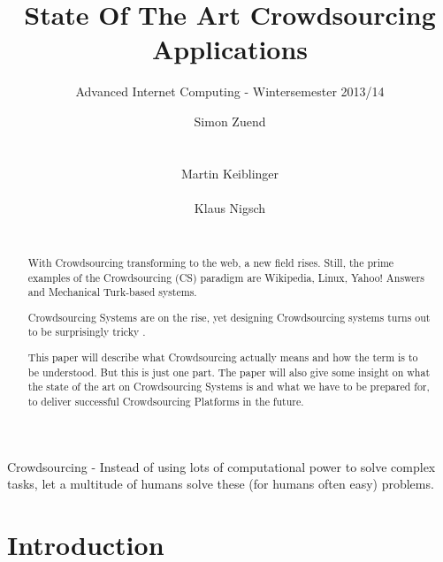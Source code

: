 \documentclass{sig-alternate}
\begin{document}
\title{State Of The Art Crowdsourcing Applications
}
\subtitle{Advanced Internet Computing - Wintersemester 2013/14
}

\author{
\alignauthor
Simon Zuend\\
       \\
       \\
\alignauthor
Martin Keiblinger\\
       \\
\alignauthor
Klaus Nigsch\\
       \\
}

\maketitle
\begin{abstract}

With Crowdsourcing transforming to the web, a new field rises. \cite{cswww}
Still, the prime examples of the Crowdsourcing (CS) paradigm are Wikipedia, 
Linux, Yahoo! Answers and Mechanical Turk-based systems.

Crowdsourcing Systems are on the rise, yet designing Crowdsourcing systems turns out to be
surprisingly tricky \cite{cswww}.

This paper will describe what Crowdsourcing actually means and how the term is to be understood.
But this is just one part. The paper will also give some insight on what the state of the art on Crowdsourcing Systems is and
what we have to be prepared for, to deliver successful Crowdsourcing Platforms in the future.

\end{abstract}


Crowdsourcing - Instead of using lots of computational power to solve complex tasks, let a multitude of humans solve these (for humans often easy) problems.


\section{Introduction}
\end{document}
